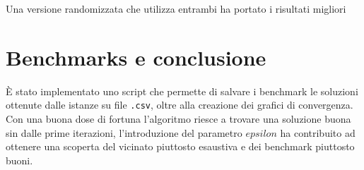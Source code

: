 \documentclass[11pt]{article}
\begin{document}
Una versione randomizzata che utilizza entrambi ha portato i risultati migliori 


\pagebreak

\section{Benchmarks e conclusione}

È stato implementato uno script che permette di salvare i benchmark le soluzioni ottenute dalle istanze su  file \verb|.csv|, oltre alla creazione dei grafici di convergenza.
Con una buona dose di fortuna l'algoritmo riesce a trovare una soluzione buona sin dalle prime iterazioni, l'introduzione del parametro \texttt{$epsilon$} ha contribuito ad ottenere una scoperta del vicinato piuttosto esaustiva e dei benchmark piuttosto buoni.
\end{document}
